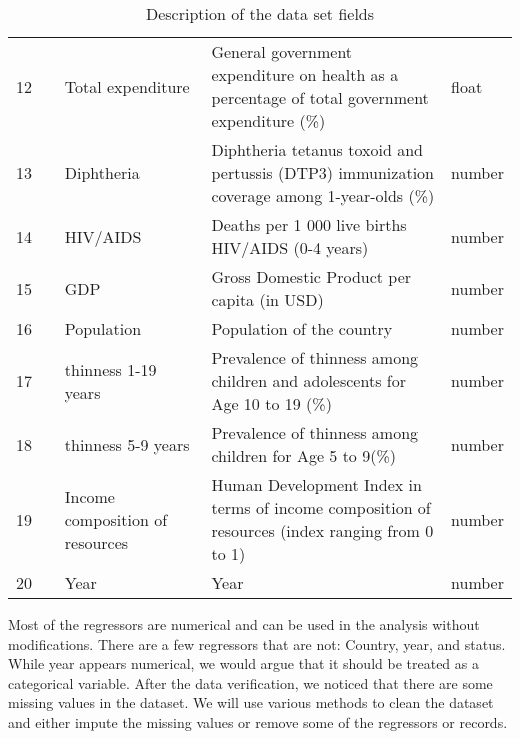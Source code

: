 \begin{table}
\begin{tabular}{p{0.1\linewidth} | p{0.3\linewidth}p{0.5\linewidth}p{0.1\linewidth}}
    12 & Total expenditure & General government expenditure on health as a percentage of total government expenditure (\%) & float \\
    13 & Diphtheria & Diphtheria tetanus toxoid and pertussis (DTP3) immunization coverage among 1-year-olds (\%) & number \\
    14 & HIV/AIDS & Deaths per 1 000 live births HIV/AIDS (0-4 years) & number \\
    15 & GDP & Gross Domestic Product per capita (in USD) & number \\
    16 & Population & Population of the country & number \\
    17 & thinness 1-19 years & Prevalence of thinness among children and adolescents for Age 10 to 19 (\%) & number \\
    18 & thinness 5-9 years & Prevalence of thinness among children for Age 5 to 9(\%) & number \\
    19 & Income composition of resources & Human Development Index in terms of income composition of resources (index ranging from 0 to 1) & number \\
    20 & Year                     & Year & number \\
    \hline
  \end{tabular}
  \caption{Description of the data set fields}
  \label{tab:description}
\end{table}

Most of the regressors are numerical and can be used in the analysis without modifications. There are a few regressors that are not: Country, year, and status. While year appears numerical, we would argue that it should be treated as a categorical variable. After the data verification, we noticed that there are some missing values in the dataset. We will use various methods to clean the dataset and either impute the missing values or remove some of the regressors or records.




